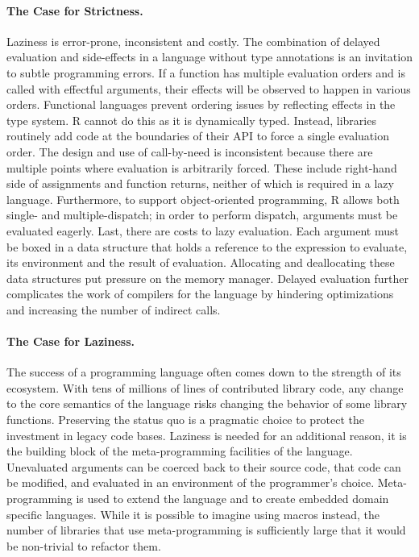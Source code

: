 \documentclass[screen,acmsmall]{acmart}
\begin{document}
\paragraph{The Case for Strictness.} Laziness is error-prone, inconsistent
and costly. The combination of delayed evaluation and side-effects in a language
without type annotations is an invitation to subtle programming errors. If a
function has multiple evaluation orders and is called with effectful arguments,
their effects will be observed to happen in various orders. Functional languages
prevent ordering issues by reflecting effects in the type system. R cannot do
this as it is dynamically typed. Instead, libraries routinely add code at the
boundaries of their API to force a single evaluation order. The design and use
of call-by-need is inconsistent because there are multiple points where
evaluation is arbitrarily forced. These include right-hand side of assignments
and function returns, neither of which is required in a lazy language.
Furthermore, to support object-oriented programming, R allows both single- and
multiple-dispatch; in order to perform dispatch, arguments must be evaluated
eagerly. Last, there are costs to lazy evaluation. Each argument must be boxed
in a data structure that holds a reference to the expression to evaluate, its
environment and the result of evaluation. Allocating and deallocating these data
structures put pressure on the memory manager. Delayed evaluation further
complicates the work of compilers for the language by hindering optimizations
and increasing the number of indirect calls.

\paragraph{The Case for Laziness.} The success of a programming language
often comes down to the strength of its ecosystem. With tens of millions of
lines of contributed library code, any change to the core semantics of the
language risks changing the behavior of some library functions. Preserving the
status quo is a pragmatic choice to protect the investment in legacy code bases.
Laziness is needed for an additional reason, it is the building block of the
meta-programming facilities of the language. Unevaluated arguments can be
coerced back to their source code, that code can be modified, and evaluated in
an environment of the programmer's choice. Meta-programming is used to extend
the language and to create embedded domain specific languages. While it is
possible to imagine using macros instead, the number of libraries that use
meta-programming is sufficiently large that it would be non-trivial to refactor
them.
\end{document}
